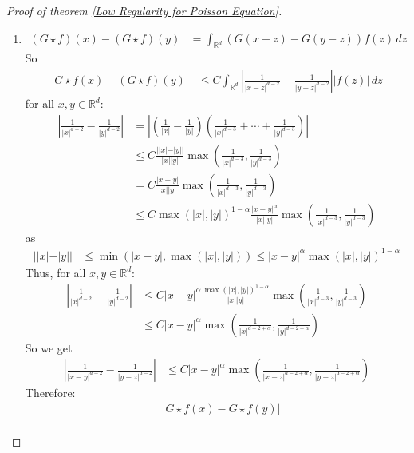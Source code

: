 \documentclass{report}
\theoremstyle{tommy}
\begin{document}
\begin{proof}[Proof of theorem \ref{Low Regularity for Poisson Equation}]
\begin{enumerate}[label=\alph*)]
      \item \begin{align*}
        (G \star f)(x) - (G \star f)(y) 
        &= \int_{\mathbb{R}^d} (G(x-z)-G(y-z)) f(z) \, dz
      \end{align*}
      So \begin{align*}
        |G \star f(x) - (G\star f)(y)| 
        &\le C \int_{\mathbb{R}^d} \left| \frac{1}{|x-z|^{d-2}} - \frac{1}{|y-z|^{d-2}}\right| |f(z)| \, dz
        \end{align*}
        for all \(x, y \in \mathbb{R}^d\):
        \begin{align*}
          \left| \frac{1}{|x|^{d-2}} - \frac{1}{|y|^{d-2}} \right|
          &= \left| \left( \frac{1}{|x|} - \frac{1}{|y|}\right) \left(\frac{1}{|x|^{d-3}} + \cdots + \frac{1}{|y|^{d-3}}\right) \right| \\
          &\le C \frac{||x|-|y||}{|x||y|} \max \left(\frac{1}{|x|^{d-3}}, \frac{1}{|y|^{d-3}}\right) \\
          &= C \frac{|x-y|}{|x||y|} \max \left(\frac{1}{|x|^{d-3}}, \frac{1}{|y|^{d-3}}\right) \\
          &\le C \max(|x|, |y|)^{1-\alpha} \frac{|x-y|^\alpha}{|x||y|} \max \left(\frac{1}{|x|^{d-3}}, \frac{1}{|y|^{d-3}}\right)
        \end{align*}
        as
        \begin{align*}
          ||x|-|y|| 
          &\le \min \left(|x-y|, \max(|x|, |y|)\right)
          \le |x-y|^\alpha \max(|x|, |y|)^{1-\alpha}
        \end{align*}
        Thus, for all \(x,y \in \mathbb{R}^d\):
        \begin{align*}
          \left| \frac{1}{|x|^{d-2}}- \frac{1}{|y|^{d-2}}\right| 
          &\le C |x-y|^\alpha \frac{\max(|x|, |y|)^{1-\alpha}}{|x||y|} \max \left(\frac{1}{|x|^{d-3}}, \frac{1}{|y|^{d-3}}\right) \\
          &\le C |x-y|^\alpha \max \left(\frac{1}{|x|^{d-2+\alpha}}, \frac{1}{|y|^{d-2+\alpha}}\right)
        \end{align*}
        So we get \begin{align*}
          \left| \frac{1}{|x-y|^{d-2}}- \frac{1}{|y-z|^{d-2}}\right|
          &\le C |x-y|^\alpha \max \left(\frac{1}{|x-z|^{d-2+\alpha}}, \frac{1}{|y-z|^{d-2+\alpha}}\right)
        \end{align*}
        Therefore:
        \begin{align*}
          &|G \star f(x) - G \star f(y)| \\

\end{align*}
\end{enumerate}
\end{proof}
\end{document}
